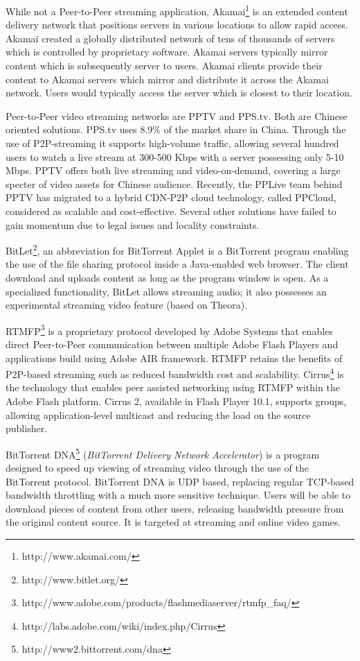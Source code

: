 While not a Peer-to-Peer streaming application,
Akamai\footnote{http://www.akamai.com/} is an extended content delivery
network that positions servers in various locations to allow rapid access.
Akamai created a globally distributed network of tens of thousands of servers
which is controlled by proprietary software.  Akamai servers typically mirror
content which is subsequently server to users.  Akamai clients provide their
content to Akamai servers which mirror and distribute it across the Akamai
network. Users would typically access the server which is closest to their
location.

Peer-to-Peer video streaming networks are PPTV and PPS.tv. Both are Chinese
oriented solutions. PPS.tv uses 8.9\% of the market share in China. Through
the use of P2P-streaming it supports high-volume traffic, allowing several
hundred users to watch a live stream at 300-500 Kbps with a server possessing
only 5-10 Mbps. PPTV offers both live streaming and video-on-demand, covering
a large specter of video assets for Chinese audience. Recently, the PPLive
team behind PPTV has migrated to a hybrid CDN-P2P cloud technology, called
PPCloud, considered as scalable and cost-effective. Several other solutions
have failed to gain momentum due to legal issues and locality constraints.

BitLet\footnote{http://www.bitlet.org/}, an abbreviation for BitTorrent Applet
is a BitTorrent program enabling the use of the file sharing protocol inside a
Java-enabled web browser. The client download and uploads content as long as
the program window is open. As a specialized functionality, BitLet allows
streaming audio; it also possesses an experimental streaming video feature
(based on Theora).

RTMFP\footnote{http://www.adobe.com/products/flashmediaserver/rtmfp_faq/} is a
proprietary protocol developed by Adobe Systems that enables direct
Peer-to-Peer communication between multiple Adobe Flash Players and
applications build using Adobe AIR framework. RTMFP retains the benefits of
P2P-based streaming such as reduced bandwidth cost and scalability.
Cirrus\footnote{http://labs.adobe.com/wiki/index.php/Cirrus} is the technology
that enables peer assisted networking using RTMFP within the Adobe Flash
platform. Cirrus 2, available in Flash Player 10.1, supports groups, allowing
application-level multicast and reducing the load on the source publisher.

BitTorrent DNA\footnote{http://www2.bittorrent.com/dna} (\textit{BitTorrent
Delivery Network Accelerator}) is a program designed to speed up viewing of
streaming video through the use of the BitTorrent protocol. BitTorrent DNA is
UDP based, replacing regular TCP-based bandwidth throttling with a much more
sensitive technique. Users will be able to download pieces of content from
other users, releasing bandwidth pressure from the original content source. It
is targeted at streaming and online video games.

